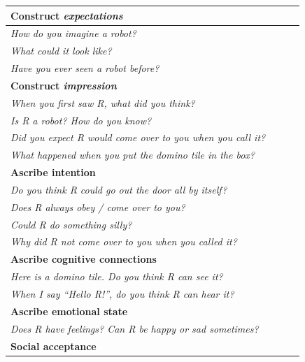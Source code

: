 \documentclass{sig-alternate}
\begin{document}
\begin{table}[h!t]
\centering
\footnotesize
\begin{tabular}{p{0.9\linewidth}}
    \toprule
    \textbf{Construct \emph{expectations}} \\
    \midrule

    \emph{How do you imagine a robot?} \\
    \emph{What could it look like?} \\
    \emph{Have you ever seen a robot before?} \\

    \toprule
    \textbf{Construct \emph{impression}} \\
    \midrule


    \emph{When you first saw R, what did you think?} \\
    \emph{Is R a robot? How do you know?} \\
    \emph{Did you expect R would come over to you when you call it?} \\
    \emph{What happened when you put the domino tile in the box?} \\

    \toprule
    \textbf{Ascribe intention} \\
    \midrule


    \emph{Do you think R could go out the door all by itself?} \\	
    \emph{Does R always obey / come over to you?} \\
    \emph{Could R do something silly?} \\
    \emph{Why did R not come over to you when you called it?} \\

    \toprule
    \textbf{Ascribe cognitive connections} \\
    \midrule


    \emph{Here is a domino tile. Do you think R can see it?} \\ 
    \emph{When I say \textit{``Hello R!''}, do you think R can hear it?} \\

    \toprule
    \textbf{Ascribe emotional state} \\
    \midrule


    \emph{Does R have feelings? Can R be happy or sad sometimes?} \\

    \toprule
    \textbf{Social acceptance} \\
    \midrule



\end{tabular}
\end{table}
\end{document}
